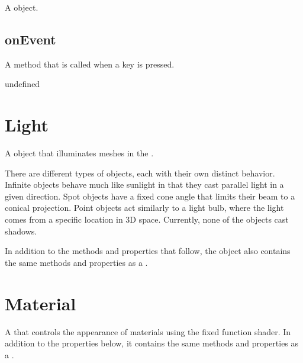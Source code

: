 \documentclass[letterpaper,12pt,english,openany,oneside]{sphinxmanual}
\begin{document}
A  object.


\subsection{onEvent}
\label{\detokenize{JS_3D_API:onevent-2}}\label{\detokenize{JS_3D_API:id10}}
A method that is called when a key is pressed.

\label{\detokenize{JS_3D_API:syntax-34}}

\begin{sphinxVerbatim}[commandchars=\\\{\}]
\end{sphinxVerbatim}
\label{\detokenize{JS_3D_API:parameters-22}}

\label{\detokenize{JS_3D_API:section-37}}\label{\detokenize{JS_3D_API:returns-34}}

undefined


\section{Light}
\label{\detokenize{JS_3D_API:light}}
A  object that illuminates meshes in the .

There are different types of  objects, each with their own distinct behavior. Infinite  objects behave much like sunlight in that they cast parallel light in a given direction. Spot  objects have a fixed cone angle that limits their beam to a conical projection. Point  objects act similarly to a light bulb, where the light comes from a specific location in 3D space. Currently, none of the  objects cast shadows.

In addition to the methods and properties that follow, the  object also contains the same methods and properties as a .

\label{\detokenize{JS_3D_API:properties-13}}


\section{Material}
\label{\detokenize{JS_3D_API:material}}
A  that controls the appearance of materials using the fixed function shader. In addition to the properties below, it contains the same methods and properties as a .
\end{document}
